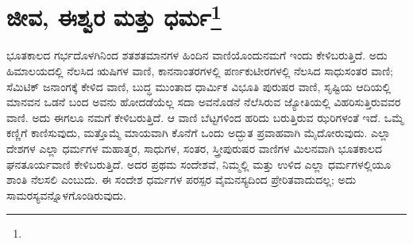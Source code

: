 
\chapter[ಜೀವ, ಈಶ್ವರ ಮತ್ತು ಧರ್ಮ]{ಜೀವ, ಈಶ್ವರ ಮತ್ತು ಧರ್ಮ\protect\footnote{}}

ಭೂತಕಾಲದ ಗರ್ಭದೊಳಗಿನಿಂದ ಶತಶತಮಾನಗಳ ಹಿಂದಿನ ವಾಣಿಯೊಂದು\break ನಮಗೆ ಇಂದು ಕೇಳಿಬರುತ್ತಿದೆ. ಅದು ಹಿಮಾಲಯದಲ್ಲಿ ನೆಲಸಿದ ಋಷಿಗಳ ವಾಣಿ, ಕಾನನಾಂತರಗಳಲ್ಲಿ ಪರ್ಣಕುಟೀರಗಳಲ್ಲಿ ನೆಲಸಿದ ಸಾಧುಸಂತರ ವಾಣಿ; ಸೆಮಿಟಿಕ್ ಜನಾಂಗಕ್ಕೆ ಕೇಳಿದ ವಾಣಿ, ಬುದ್ಧ ಮುಂತಾದ ಧಾರ್ಮಿಕ ವಿಭೂತಿ ಪುರುಷರ ವಾಣಿ, ಸೃಷ್ಟಿಯ ಆದಿಯಲ್ಲಿ ಮಾನವನ ಒಡನೆ ಬಂದ ಅವನು ಹೋದಡೆಯೆಲ್ಲ ಸದಾ ಅವನೊಡನೆ ನೆಲೆಸಿರುವ ಜ್ಯೋತಿಯಲ್ಲಿ ವಿಹರಿಸುತ್ತಿರುವವರ ವಾಣಿ. ಅದು ಈಗಲೂ ನಮಗೆ ಕೇಳಿಬರುತ್ತಿದೆ. ಆ ವಾಣಿ ಬೆಟ್ಟಗಳಿಂದ ಹರಿದು ಬರುತ್ತಿರುವ ಝರಿಗಳಂತೆ ಇದೆ. ಒಮ್ಮೆ ಕಣ್ಣಿಗೆ ಕಾಣಿಸುವುದು, ಮತ್ತೊಮ್ಮೆ ಮಾಯವಾಗಿ ಕೊನೆಗೆ ಒಂದು ಅದ್ಭುತ ಪ್ರವಾಹವಾಗಿ ಮೈದೋರುವುದು. ಎಲ್ಲಾ ದೇಶಗಳ ಎಲ್ಲಾ ಧರ್ಮಗಳ ಮಹಾತ್ಮರ, ಸಾಧುಗಳ, ಸಂತರ, ಸ್ತ್ರೀಪುರುಷರ ವಾಣಿಗಳ ಮಿಲನವಾಗಿ ಭೂತಕಾಲದ ಘನತೂರ್ಯವಾಣಿ ಕೇಳಿಬರುತ್ತಿದೆ. ಅದರ ಪ್ರಥಮ ಸಂದೇಶವೆ, ನಿಮ್ಮಲ್ಲಿ ಮತ್ತು ಉಳಿದ ಎಲ್ಲಾ ಧರ್ಮಗಳಲ್ಲಿಯೂ ಶಾಂತಿ ನೆಲಸಲಿ ಎಂಬುದು. ಈ ಸಂದೇಶ ಧರ್ಮಗಳ ಪರಸ್ಪರ ವೈಮನಸ್ಯದಿಂದ ಪ್ರೇರಿತವಾದುದಲ್ಲ; ಅದು ಸಾಮರಸ್ಯವನ್ನೊಳಗೊಂಡಿರುವುದು.

